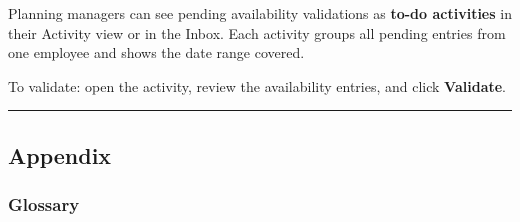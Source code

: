 \documentclass[
  paper=a4,
  ,captions=tableheading
]{scrartcl}
\begin{document}
Planning managers can see pending availability validations as
\textbf{to-do activities} in their Activity view or in the Inbox. Each
activity groups all pending entries from one employee and shows the date
range covered.

To validate: open the activity, review the availability entries, and
click \textbf{Validate}.

\begin{center}\rule{0.5\linewidth}{0.5pt}\end{center}

\hypertarget{appendix}{%
\subsection{Appendix}\label{appendix}}

\hypertarget{glossary}{%
\subsubsection{Glossary}\label{glossary}}
\end{document}
